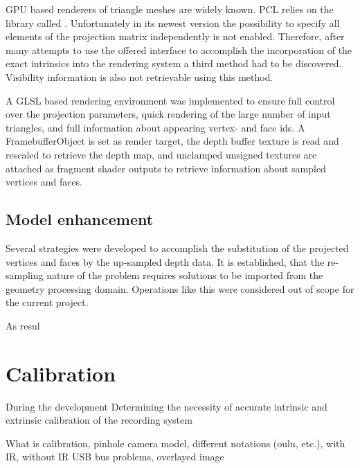 \documentclass{ucl_thesis}
\begin{document}
\par GPU based renderers of triangle meshes are widely known. PCL relies on the library called \citep{vtk}. Unfortunately in its newest version the possibility to specify all elements of the projection matrix independently is not enabled. Therefore, after many attempts to use the offered interface to accomplish the incorporation of the exact intrinsics into the rendering system a third method had to be discovered. Visibility information is also not retrievable using this method.
\par A GLSL based rendering environment was implemented to ensure full control over the projection parameters, quick rendering of the large number of input triangles, and full information about appearing vertex- and face ids. A FramebufferObject is set as render target, the depth buffer texture is read and rescaled to retrieve the depth map, and unclamped unsigned textures are attached as fragment shader outputs to retrieve information about sampled vertices and faces.

\subsection{Model enhancement}
\par Several strategies were developed to accomplish the substitution of the projected vertices and faces by the up-sampled depth data. It is established, that the re-sampling nature of the problem requires solutions to be imported from the geometry processing domain. Operations like this were considered out of scope for the current project.

\par As resul

\section{Calibration}
\label{sec:calibration}
During the development Determining the necessity of accurate intrinsic and extrinsic calibration of the recording system

What is calibration, pinhole camera model, different notations (oulu, etc.), 
with IR, without IR
USB bus problems, overlayed image
\end{document}
